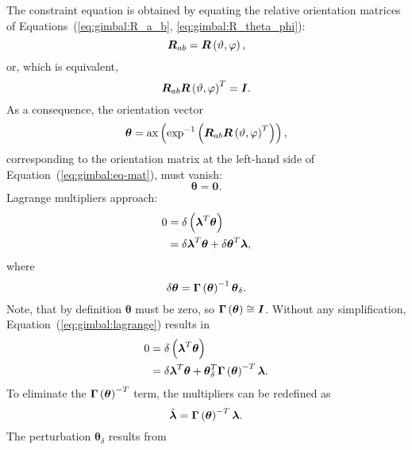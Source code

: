 \documentclass[10pt,dvips,fleqn,subeqn]{report}
\newcommand{\T}[1]{\boldsymbol{#1}}
\begin{document}
\noindent
The constraint equation is obtained by equating the relative orientation
matrices of Equations~(\ref{eq:gimbal:R_a_b}, \ref{eq:gimbal:R_theta_phi}):
\begin{equation}
	\T{R}_{ab} = \T{R}\plbr{\vartheta, \varphi} ,
\end{equation}
or, which is equivalent,
\begin{equation}
	\T{R}_{ab} \T{R}\plbr{\vartheta, \varphi}^T = \T{I} .
	\label{eq:gimbal:eq-mat}
\end{equation}
As a consequence, the orientation vector
\begin{equation}
	\T{\theta} = \llk{ax}\plbr{\llk{exp}^{-1}\plbr{
		\T{R}_{ab} \T{R}\plbr{\vartheta, \varphi}^T
	}} ,
\end{equation}
corresponding to the orientation matrix at the left-hand side
of Equation~(\ref{eq:gimbal:eq-mat}),
must vanish:
\begin{equation}
	\T{\theta} = \T{0} .
	\label{eq:GIMBAL-CONSTRAINT}
\end{equation}
Lagrange multipliers approach:
\begin{align}
	0 &= \delta\plbr{\T{\lambda}^T \T{\theta}} \nonumber \\
	&= \delta\T{\lambda}^T \T{\theta} + \delta\T{\theta}^T \T{\lambda} ,
	\label{eq:gimbal:lagrange}
\end{align}
where
\begin{equation}
	\delta\T{\theta}
	= \T{\Gamma}\plbr{\T{\theta}}^{-1} \T{\theta}_{\delta} .
\end{equation}
Note, that by definition $\T{\theta}$ must be zero,
so $\T{\Gamma}\plbr{\T{\theta}}\cong\T{I}$.
Without any simplification, Equation~(\ref{eq:gimbal:lagrange}) results in
\begin{align}
	0 &= \delta\plbr{\T{\lambda}^T \T{\theta}} \\
	&= \delta\T{\lambda}^T \T{\theta}
	+ \T{\theta}_{\delta}^T \T{\Gamma}\plbr{\T{\theta}}^{-T}\T{\lambda} .
\end{align}
To eliminate the $\T{\Gamma}\plbr{\T{\theta}}^{-T}$ term,
the multipliers can be redefined as 
\begin{equation}
	\hat{\T{\lambda}} = \T{\Gamma}\plbr{\T{\theta}}^{-T} \T{\lambda} .
\end{equation}
The perturbation $\T{\theta}_{\delta}$ results from
\end{document}
